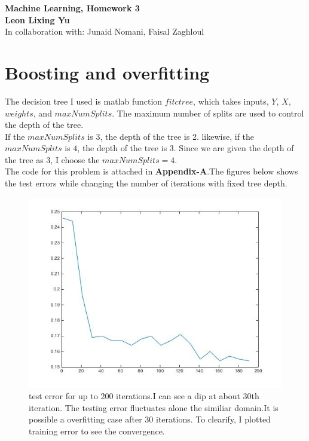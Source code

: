 \documentclass[twoside]{article}
\theoremstyle{definition}
\theoremstyle{definition}
\theoremstyle{remark}
\begin{document}
\textbf{Machine Learning, Homework 3}\\
\textbf{Leon Lixing Yu}\\
In collaboration with: Junaid Nomani, Faisal Zaghloul\\

\section{Boosting and overfitting}
The decision tree I used is matlab function $fitctree$, which takes inputs, $Y$, $X$, $weights$, and $maxNumSplits$. The maximum number of splits are used to control the depth of the tree.\\
If the $maxNumSplits$ is $3$, the depth of the tree is 2. likewise, if the $maxNumSplits$ is $4$, the depth of the tree is 3. Since we are given the depth of the tree as $3$, I choose the $maxNumSplits = 4$. \\
The code for this problem is attached in \textbf{Appendix-A}.The figures below shows the test errors while changing the number of iterations with fixed tree depth.  

\begin{figure}[H]
\centering
\includegraphics[width=120mm]{problem1_1.jpg}
\caption{test error for up to 200 iterations.I can see a dip at about 30th iteration. The testing error fluctuates alone the similiar domain.It is possible a overfitting case after 30 iterations. To clearify, I plotted training error to see the convergence.}
\end{figure}
\end{document}
